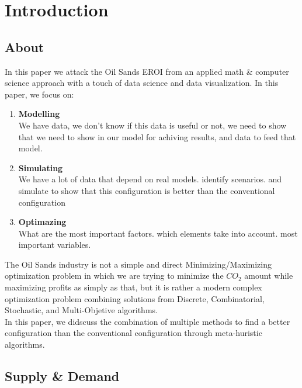 \documentclass[12pt]{article}
\begin{document}
\maketitle
\tableofcontents
\newpage

\section{Introduction}

\subsection{About}
In this paper we attack the Oil Sands EROI from an applied math \& computer science approach with a touch of data science and data visualization. In this paper, we focus on: 
\begin{enumerate}
\item {\bf Modelling} \\
We have data, we don't know if this data is useful or not, we need to show that we
need to show in our model for achiving results, and data to feed that model. 
\item {\bf Simulating} \\
We have a lot of data that depend on real models. identify scenarios. and simulate to 
show that this configuration is better than the conventional configuration 
\item {\bf Optimazing} \\
What are the most important factors. which elements take into account. most important
variables. \\
\end{enumerate}

The Oil Sands industry is not a simple and direct Minimizing/Maximizing optimization problem in which we are trying to minimize the $CO_2$ amount while maximizing profits as simply as that, but it is rather a modern complex optimization problem combining solutions from Discrete, Combinatorial, Stochastic, and Multi-Objetive algorithms. \\

In this paper, we didscuss the combination of multiple methods to find a better configuration than the conventional configuration through meta-huristic algorithms. \\

\subsection{Supply \& Demand}
\end{document}
